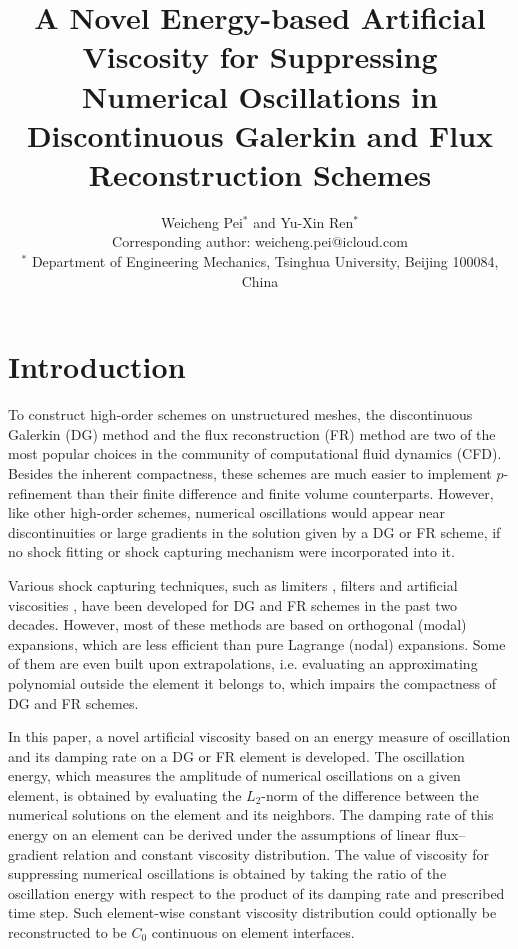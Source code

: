 \documentclass[10pt]{article}
\title{
\bf A Novel Energy-based Artificial Viscosity for Suppressing Numerical Oscillations in Discontinuous Galerkin and Flux Reconstruction Schemes
}
\author{
Weicheng Pei$^{*}$ and Yu-Xin Ren$^{*}$\\
Corresponding author: weicheng.pei@icloud.com\\
$^{*}$ Department of Engineering Mechanics, Tsinghua University, Beijing 100084, China
}
\date{}
\begin{document}
\maketitle
\afterpage{\fancyhead{}}

\centerline{
}
\vskip0.5cm 

\section{Introduction}
To construct high-order schemes on unstructured meshes, the discontinuous Galerkin (DG) method \cite{Cockburn_2001,Hesthaven_2008} and the flux reconstruction (FR) method \cite{Huynh_2007,Huynh_2014} are two of the most popular choices in the community of computational fluid dynamics (CFD).
%
Besides the inherent compactness, these schemes are much easier to implement $p$-refinement than their finite difference and finite volume counterparts.
%
However, like other high-order schemes, numerical oscillations would appear near discontinuities or large gradients in the solution given by a DG or FR scheme, if no shock fitting or shock capturing mechanism were incorporated into it.
%

%
Various shock capturing techniques, such as limiters \cite{Zhong_2013,Zhu_2013,Zhu_2020,Zhu_2023,Li_2020}, filters \cite{Panourgias_2016,Dzanic_2022} and artificial viscosities \cite{Persson_2006,Klockner_2011,Discacciati_2020}, have been developed for DG and FR schemes in the past two decades.
%
However, most of these methods are based on orthogonal (modal) expansions, which are less efficient than pure Lagrange (nodal) expansions.
%
Some of them are even built upon extrapolations, i.e. evaluating an approximating polynomial outside the element it belongs to, which impairs the compactness of DG and FR schemes.
%

%
In this paper, a novel artificial viscosity based on an energy measure of oscillation and its damping rate on a DG or FR element is developed.
%
The oscillation energy, which measures the amplitude of numerical oscillations on a given element, is obtained by evaluating the $L_2$-norm of the difference between the numerical solutions on the element and its neighbors.
%
The damping rate of this energy on an element can be derived under the assumptions of linear flux--gradient relation and constant viscosity distribution.
%
The value of viscosity for suppressing numerical oscillations is obtained by taking the ratio of the oscillation energy with respect to the product of its damping rate and prescribed time step.
%
Such element-wise constant viscosity distribution could optionally be reconstructed to be $C_0$ continuous on element interfaces.
\end{document}
